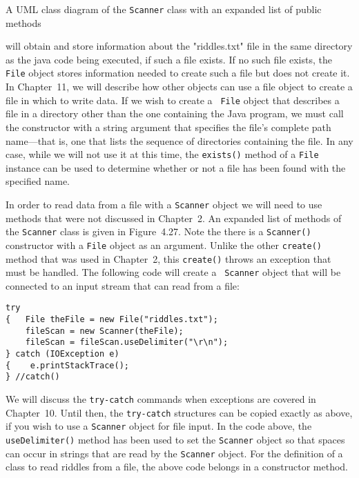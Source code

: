 {A UML class diagram of the {\tt Scanner} class with an
expanded list of public methods
\label{fig-scanner2uml}}

\noindent will obtain and store information about the "riddles.txt" file in
the same directory as the java code being executed, if such a file
exists.  If no such file exists, the {\tt File} object stores
information needed to create such a file but does not create it.  In
Chapter~11, we will describe how other objects can use a file object
to create a file in which to write data.  If we wish to create a {\tt
File} object that describes a file in a directory other than the one
containing the Java program, we must call the constructor with a
string argument that specifies the file's complete path name---that is,
one that lists the sequence of directories containing the file.  In
any case, while we will not use it at this time, the {\tt exists()}
method of a {\tt File} instance can be used to determine whether or
not a file has been found with the specified name.

In order to read data from a file with a {\tt Scanner} object we will
need to use methods that were not discussed in Chapter~2.  An expanded
list of methods of the {\tt Scanner} class is given in
Figure~4.27. Note the there is a {\tt Scanner()} constructor with a
{\tt File} object as an argument.  Unlike the other {\tt create()}
method that was used in Chapter~2, this {\tt create()} throws an
exception that must be handled.  The following code will create a {\tt
Scanner} object that will be connected to an input stream that can
read from a file:

\begin{jjjlisting}
\begin{lstlisting}
try
{   File theFile = new File("riddles.txt");
    fileScan = new Scanner(theFile);
    fileScan = fileScan.useDelimiter("\r\n");
} catch (IOException e)
{    e.printStackTrace();
} //catch()
\end{lstlisting}
\end{jjjlisting}

\noindent We will discuss the {\tt try-catch} commands when exceptions 
are covered in Chapter~10.  Until then, the {\tt try-catch} structures
can be copied exactly as above, if you wish to use a {\tt Scanner}
object for file input.  In the code above, the {\tt useDelimiter()}
method has been used to set the {\tt Scanner} object so that spaces
can occur in strings that are read by the {\tt Scanner} object. For
the definition of a class to read riddles from a file, the above code
belongs in a constructor method.


